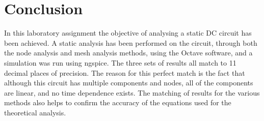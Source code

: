 \section{Conclusion}
\label{sec:conclusion}

In this laboratory assignment the objective of analysing a static DC circuit has been
achieved. A static analysis has been performed on the circuit, through both the
node analysis and mesh analysis methods, using the Octave software, and a simulation
was run using ngspice.
The three sets of results all match to 11 decimal places of precision.
The reason for this perfect match is the fact that although this circuit has multiple
components and nodes, all of the components are linear, and no time dependence exists.
The matching of results for the various methods also helps to confirm the accuracy of the equations
used for the theoretical analysis.
